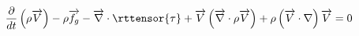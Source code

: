 \begin{equation}
\frac{\partial}{dt}\left(\rho\overrightarrow{V}\right) 
  - \rho \overrightarrow{f_g} 
  - \overrightarrow{\nabla}\cdot\rttensor{\tau} 
  + \overrightarrow{V}\left(\overrightarrow{\nabla}\cdot \rho\overrightarrow{V}\right) 
  + \rho\left(\overrightarrow{V}\cdot\nabla\right)\overrightarrow{V} = 0
\end{equation}

